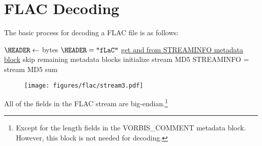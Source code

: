 \clearpage

\section{FLAC Decoding}

The basic process for decoding a FLAC file is as follows:
\par
\noindent
{}
$\HEADER \leftarrow$  bytes\;
\ASSERT $\text{\HEADER} = \texttt{"fLaC"}$\;
\hyperref[flac:read_metadata]{get \PCMCOUNT and \MDSUM from STREAMINFO metadata block}\;
skip remaining metadata blocks\;
initialize stream MD5\;
\ASSERT STREAMINFO \MDSUM = stream MD5 sum
\EALGORITHM
\begin{figure}[h]
\texttt{[image: figures/flac/stream3.pdf]}
\end{figure}
\par
All of the fields in the FLAC stream are big-endian.\footnote{Except
for the length fields in the VORBIS\_COMMENT metadata block.
However, this block is not needed for decoding.
}

\clearpage


